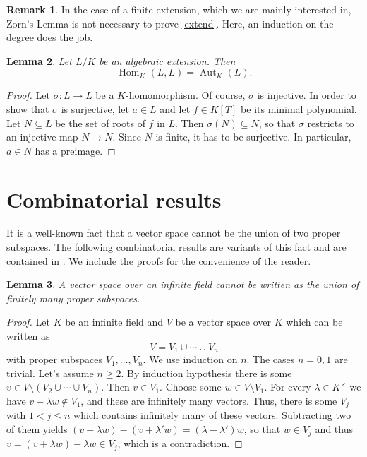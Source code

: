 \documentclass[11pt,reqno]{amsart}
\theoremstyle{standard}
\newtheorem{lemma}{Lemma}[section]
\theoremstyle{definition}
\newtheorem{rem}[lemma]{Remark}
\DeclareMathOperator{\Hom}{Hom}
\DeclareMathOperator{\Aut}{Aut}
\begin{document}
\begin{rem}
In the case of a finite extension, which we are mainly interested in, Zorn's Lemma is not necessary to prove \cref{extend}. Here, an induction on the degree does the job.
\end{rem}
 
\begin{lemma} \label{auto}
Let $L/K$ be an algebraic extension. Then
\[\Hom_K(L,L) = \Aut_K(L).\]
\end{lemma}

\begin{proof}
Let $\sigma : L \to L$ be a $K$-homomorphism. Of course, $\sigma$ is injective. In order to show that $\sigma$ is surjective, let $a \in L$ and let $f \in K[T]$ be its minimal polynomial. Let $N \subseteq L$ be the set of roots of $f$ in $L$. Then $\sigma(N) \subseteq N$, so that $\sigma$ restricts to an injective map $N \to N$. Since $N$ is finite, it has to be surjective. In particular, $a \in N$ has a preimage.
\end{proof}



\section{Combinatorial results}

It is a well-known fact that a vector space cannot be the union of two proper subspaces. The following combinatorial results are variants of this fact and are contained in \cite{BBS}. We include the proofs for the convenience of the reader.
 
\begin{lemma} \label{vecunion}
A vector space over an infinite field cannot be written as the union of finitely many proper subspaces.
\end{lemma}

\begin{proof}
Let $K$ be an infinite field and $V$ be a vector space over $K$ which can be written as
\[V = V_1 \cup \cdots \cup V_n\]
with proper subspaces $V_1,\dotsc,V_n$. We use induction on $n$. The cases $n=0,1$ are trivial. Let's assume $n \geq 2$. By induction hypothesis there is some $v \in V \setminus (V_2 \cup \cdots \cup V_n)$. Then $v \in V_1$. Choose some $w \in V \setminus V_1$. For every $\lambda \in K^{\times}$ we have $v + \lambda w \notin V_1$, and these are infinitely many vectors. Thus, there is some $V_j$ with $1 < j \leq n$ which contains infinitely many of these vectors. Subtracting two of them yields $(v + \lambda w) - (v +  \lambda' w) = (\lambda - \lambda')w$, so that $w \in V_j$ and thus $v = (v + \lambda w) - \lambda w \in V_j$, which is a contradiction.
\end{proof}
\end{document}
